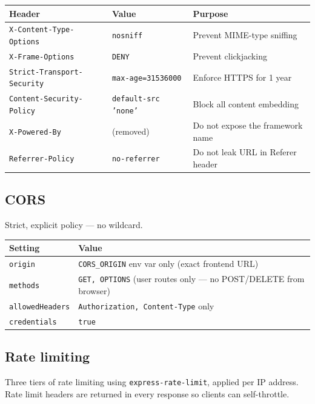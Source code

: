 \documentclass[11pt]{article}
\begin{document}
\begin{table}[h]
\small
\begin{tabularx}{\textwidth}{l l X}
\toprule
\textbf{Header} & \textbf{Value} & \textbf{Purpose} \\
\midrule
\texttt{X-Content-Type-Options} & \texttt{nosniff} & Prevent MIME-type sniffing \\
\texttt{X-Frame-Options} & \texttt{DENY} & Prevent clickjacking \\
\texttt{Strict-Transport-Security} & \texttt{max-age=31536000} & Enforce HTTPS for 1 year \\
\texttt{Content-Security-Policy} & \texttt{default-src 'none'} & Block all content embedding \\
\texttt{X-Powered-By} & (removed) & Do not expose the framework name \\
\texttt{Referrer-Policy} & \texttt{no-referrer} & Do not leak URL in Referer header \\
\bottomrule
\end{tabularx}
\end{table}

\subsection{CORS}

Strict, explicit policy --- no wildcard.

\begin{table}[h]
\small
\begin{tabularx}{\textwidth}{l X}
\toprule
\textbf{Setting} & \textbf{Value} \\
\midrule
\texttt{origin} & \texttt{CORS\_ORIGIN} env var only (exact frontend URL) \\
\texttt{methods} & \texttt{GET, OPTIONS} (user routes only --- no POST/DELETE from browser) \\
\texttt{allowedHeaders} & \texttt{Authorization, Content-Type} only \\
\texttt{credentials} & \texttt{true} \\
\bottomrule
\end{tabularx}
\end{table}

\subsection{Rate limiting}

Three tiers of rate limiting using \texttt{express-rate-limit}, applied per IP address.
Rate limit headers are returned in every response so clients can self-throttle.
\end{document}
